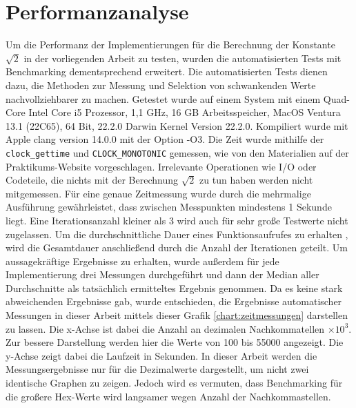 \documentclass[course=erap]{aspdoc}
\begin{document}
\section{Performanzanalyse}
 Um die Performanz der Implementierungen für die Berechnung der Konstante $\sqrt{2}$ in der vorliegenden Arbeit zu testen, wurden die automatisierten Tests mit Benchmarking dementsprechend erweitert. Die automatisierten Tests dienen dazu, die Methoden zur Messung und Selektion von schwankenden Werte nachvollziehbarer zu machen. Getestet wurde auf einem System mit einem Quad-Core Intel Core i5 Prozessor, 1,1 GHz, 16 GB Arbeitsspeicher, MacOS Ventura 13.1 (22C65), 64 Bit, 22.2.0 Darwin Kernel Version 22.2.0. Kompiliert wurde mit Apple clang version 14.0.0 mit der Option -O3. Die Zeit wurde mithilfe der \texttt{clock\_gettime} und \texttt{CLOCK\_MONOTONIC} gemessen, wie von den Materialien auf der Praktikums-Website vorgeschlagen.  Irrelevante Operationen wie I/O oder Codeteile, die nichts mit der Berechnung $\sqrt{2}$ zu tun haben werden nicht mitgemessen. Für eine genaue Zeitmessung wurde durch die mehrmalige Ausführung gewährleistet, dass zwischen Messpunkten mindestens 1 Sekunde liegt. Eine Iterationsanzahl kleiner als 3 wird auch für sehr große Testwerte nicht zugelassen. Um die durchschnittliche Dauer eines Funktionsaufrufes zu erhalten , wird die Gesamtdauer anschließend durch die Anzahl der Iterationen geteilt. Um aussagekräftige Ergebnisse zu erhalten, wurde außerdem für jede Implementierung drei Messungen durchgeführt und dann der Median aller Durchschnitte als tatsächlich ermitteltes Ergebnis genommen. Da es keine stark abweichenden Ergebnisse gab, wurde entschieden, die Ergebnisse automatischer Messungen in dieser Arbeit mittels dieser Grafik \ref{chart:zeitmessungen} darstellen zu lassen. Die x-Achse ist dabei die Anzahl an dezimalen Nachkommatellen $\times 10 ^ {3}$. Zur bessere Darstellung werden hier die Werte von 100 bis 55000 angezeigt. Die y-Achse zeigt dabei die Laufzeit in Sekunden. In dieser Arbeit werden die Messungsergebnisse nur für die Dezimalwerte dargestellt, um nicht zwei identische Graphen zu zeigen. Jedoch wird es vermuten, dass Benchmarking für die großere Hex-Werte wird langsamer wegen Anzahl der Nachkommastellen.
\end{document}
